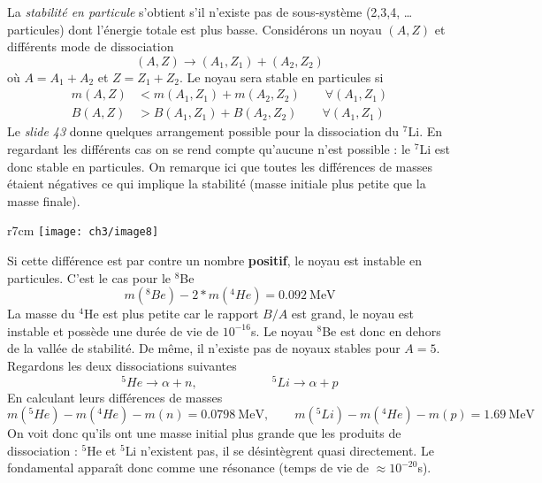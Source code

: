 La \textit{stabilité en particule} s'obtient s'il n'existe pas de sous-système (2,3,4, \dots particules) dont
l'énergie totale est plus basse. Considérons un noyau $(A,Z)$ et différents mode de dissociation
\begin{equation}
(A,Z)\to (A_1,Z_1)+(A_2,Z_2)
\end{equation}
où $A = A_1+A_2$ et $Z=Z_1+Z_2$. Le noyau sera stable en particules si
\begin{equation}
\begin{array}{ll}
m(A,Z)&< m(A_1,Z_1)+m(A_2,Z_2)\qquad\forall(A_1,Z_1)\\
B(A,Z)&> B(A_1,Z_1)+B(A_2,Z_2)\qquad\forall(A_1,Z_1)
\end{array}
\end{equation}
Le \textit{slide 43}  donne quelques arrangement possible pour la dissociation du $^7$Li. En regardant les 
différents cas on se rend compte qu'aucune n'est possible : le $^7$Li est donc stable en particules. On remarque
ici que toutes les différences de masses étaient négatives ce qui implique la stabilité (masse initiale plus 
petite que la masse finale).\\

	\begin{wrapfigure}[9]{r}{7cm}
	\texttt{[image: ch3/image8]}
	\end{wrapfigure}
Si cette différence est par contre un nombre \textbf{positif}, le noyau est instable en particules. C'est le
cas pour le $^8$Be
\begin{equation}
m(^8Be)-2*m(^4He) = 0.092\ \text{MeV}
\end{equation}
La masse du $^4$He est plus petite car le rapport $B/A$ est grand, le noyau est instable et possède une durée de 
vie de $10^{-16}$s. Le noyau $^8$Be est donc en dehors de la vallée de stabilité. De même, il n'existe pas de
noyaux stables pour $A=5$. Regardons les deux dissociations suivantes
\begin{equation}
^5He \to \alpha+n,\qquad\qquad\qquad ^5Li\to\alpha+p
\end{equation}
En calculant leurs différences de masses
\begin{equation}
m(^5He)-m(^4He)-m(n) = 0.0798\ \text{MeV},\qquad 
m(^5Li)-m(^4He)-m(p) = 1.69\ \text{MeV}
\end{equation}
On voit donc qu'ils ont une masse initial plus grande que les produits de dissociation : $^5$He et $^5$Li 
n'existent pas, il se désintègrent quasi directement. Le fondamental apparaît donc comme une résonance
(temps de vie de $\approx 10^{-20}$s).\\


